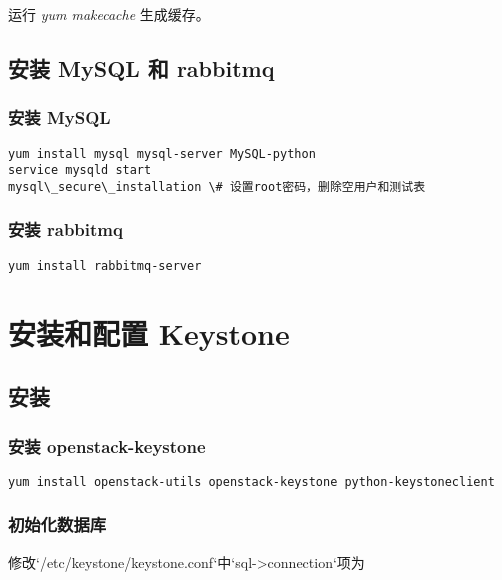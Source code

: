 \documentclass[a4paper,12pt,english]{sphinxmanual}
\begin{document}
运行 \emph{yum makecache} 生成缓存。


\section{安装 MySQL 和 rabbitmq}
\label{prepare:mysql-rabbitmq}

\subsection{安装 MySQL}
\label{prepare:mysql}
\begin{Verbatim}[commandchars=\\\{\}]
yum install mysql mysql-server MySQL-python
service mysqld start
mysql\_secure\_installation \# 设置root密码，删除空用户和测试表
\end{Verbatim}


\subsection{安装 rabbitmq}
\label{prepare:rabbitmq}
\begin{Verbatim}[commandchars=\\\{\}]
yum install rabbitmq-server
\end{Verbatim}


\chapter{安装和配置 Keystone}
\label{keystone:keystone}\label{keystone::doc}

\section{安装}
\label{keystone:id1}

\subsection{安装 openstack-keystone}
\label{keystone:openstack-keystone}
\begin{Verbatim}[commandchars=\\\{\}]
yum install openstack-utils openstack-keystone python-keystoneclient
\end{Verbatim}


\subsection{初始化数据库}
\label{keystone:id2}
修改{}`/etc/keystone/keystone.conf{}`中{}`sql-\textgreater{}connection{}`项为
\end{document}

